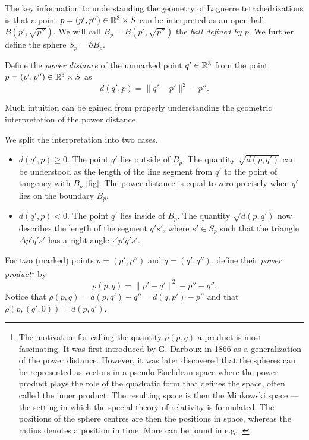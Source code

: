 The key information to understanding the geometry of Laguerre tetrahedrizations is that a point $p=(p',p'')\in {\mathbb R^3}\times S$ can be interpreted as an open ball $B(p',\sqrt{p''})$. We will call $B_p = B(p',\sqrt{p''})$ the \textit{ball defined by $p$}. We further define the sphere $S_p=\partial B_p$. 


\begin{definition}
	Define the \textit{power distance} of the unmarked point $q'\in {\mathbb R^3}$ from the point $p=(p',p'')\in{\mathbb R^3}\times S$ as
	$$d(q',p) = \|q'-p'\|^2 - p''.$$
\end{definition}
Much intuition can be gained from properly understanding the geometric interpretation of the power distance.

\begin{remark}
	We split the interpretation into two cases. 
\begin{itemize}
	\item $d(q',p) \geq 0$. The point $q'$ lies outside of $B_p$. The quantity $\sqrt{d(p,q')}$ can be understood as the length of the line segment from $q'$ to the point of tangency with $B_p$ [fig]. The power distance is equal to zero precisely when $q'$ lies on the boundary $B_p$.
	\item $d(q',p) < 0$. The point $q'$ lies inside of $B_p$. The quantity $\sqrt{d(p,q')}$ now describes the length of the segment $q's'$, where $s' \in S_p$ such that the triangle $\Delta p'q's'$ has a right angle $\angle p'q's'$. 
\end{itemize}
\end{remark}

\begin{definition}
	For two (marked) points $p=(p',p'')$ and $q=(q',q'')$, define their \textit{power product}\footnote{ The motivation for calling the quantity $\rho(p,q)$ a product is most fascinating. It was first introduced by G. Darboux in 1866 as a generalization of the power distance. However, it was later discovered that the spheres can be represented as vectors in a pseudo-Euclidean space where the power product plays the role of the quadratic form that defines the space, often called the inner product. The resulting space is then the Minkowski space --- the setting in which the special theory of relativity is formulated. The positions of the sphere centres are then the positions in space, whereas the radius denotes a position in time. More can be found in e.g. \cite{Kocik2007}.} by 
$$\rho(p,q) = \|p'-q'\|^2 - p'' - q''.$$
Notice that $\rho(p,q) = d(p,q') - q'' = d(q,p') - p''$ and that $\rho(p,(q',0)) = d(p,q')$.
\end{definition}

